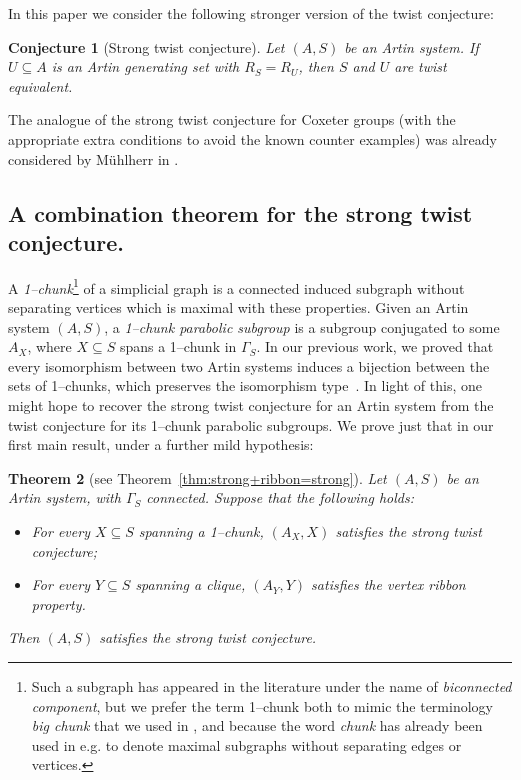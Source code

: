 \documentclass[svgnames]{amsart}
\theoremstyle{plain}
\newtheorem{thmintro}{Theorem}
\newtheorem{conjintro}[thmintro]{Conjecture}
\theoremstyle{definition}
\begin{document}
In this paper we consider the following stronger version of the twist conjecture:
\begin{conjintro}[Strong twist conjecture]\label{conjintro:Stc}
Let $(A, S)$ be an Artin system. If $U \subseteq A$ is an Artin generating set with $R_S=R_U$, then $S$ and $U$ are twist equivalent. 
\end{conjintro}
The analogue of the strong twist conjecture for Coxeter groups (with the appropriate extra conditions to avoid the known counter examples) was already considered by M\"uhlherr in \cite[Conjecture 2]{Muhlherr}. 



\subsection*{A combination theorem for the strong twist conjecture.}
A \emph{1--chunk}\footnote{Such a subgraph has appeared in the literature under the name of \emph{biconnected component}, but we prefer the term 1--chunk both to mimic the terminology \emph{big chunk} that we used in \cite{JonManSar_JSJSpl}, and because the word \emph{chunk} has already been used in e.g. \cite{crisp2005automorphisms,an2022automorphismgroupsartingroup,BMV,Jones_VF} to denote maximal subgraphs without separating edges or vertices.} of a simplicial graph is a connected induced subgraph without separating vertices which is maximal with these properties. Given an Artin system $(A,S)$, a \emph{1--chunk parabolic subgroup} is a subgroup conjugated to some $A_X$, where $X\subseteq S$ spans a 1--chunk in $\Gamma_S$. In our previous work, we proved that every isomorphism between two Artin systems induces a bijection between the sets of 1--chunks, which preserves the isomorphism type~\cite{JonManSar_JSJSpl}. In light of this, one might hope to recover the strong twist conjecture for an Artin system from the twist conjecture for its 1--chunk parabolic subgroups. We prove just that in our first main result, under a further mild hypothesis:
\begin{thmintro}[see Theorem~\ref{thm:strong+ribbon=strong}]\label{thmintro:strong+ribbon=strong}
  Let $(A,S)$ be an Artin system, with $\Gamma_S$ connected. Suppose that the following holds:
    \begin{itemize}
        \item For every $X\subseteq S$ spanning a 1--chunk, $(A_X,X)$ satisfies the strong twist conjecture;
        \item For every $Y\subseteq S$ spanning a clique, $(A_Y,Y)$ satisfies the vertex ribbon property.
    \end{itemize} 
    Then $(A,S)$ satisfies the strong twist conjecture.
\end{thmintro}
\end{document}
